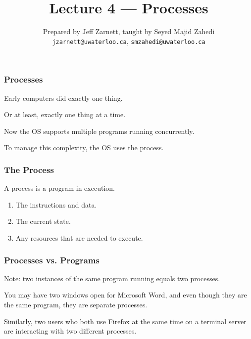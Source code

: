 

\title{Lecture 4 --- Processes }

\author{Prepared by Jeff Zarnett, taught by Seyed Majid Zahedi \\ \small \texttt{jzarnett@uwaterloo.ca}, \texttt{smzahedi@uwaterloo.ca}}
\date{}




\begin{frame}
	\titlepage

\end{frame}

\begin{frame}
	\frametitle{Processes}


	Early computers did exactly one thing.

	Or at least, exactly one thing at a time.

	Now the OS supports multiple programs running concurrently.

	To manage this complexity, the OS uses the \alert{process}.

\end{frame}

\begin{frame}
	\frametitle{The Process}

	A process is a program in execution.

	\begin{enumerate}
		\item The instructions and data.
		\item The current state.
		\item Any resources that are needed to execute.
	\end{enumerate}

\end{frame}


\begin{frame}
	\frametitle{Processes vs. Programs}

	Note: two instances of the same program running equals two processes.

	You may have two windows open for Microsoft Word, and even though they are the same program, they are separate processes.


	Similarly, two users who both use Firefox at the same time on a terminal server are interacting with two different processes.

\end{frame}


